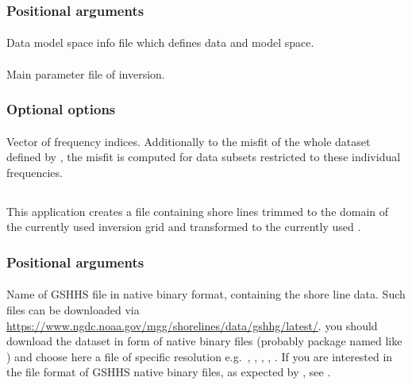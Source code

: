\subsubsection{Positional arguments}
\paragraph{}
Data model space info file which defines data and model space.
\paragraph{}
Main parameter file of inversion.
\subsubsection{Optional options}
\paragraph{}
Vector of  frequency indices. Additionally to the misfit of the whole dataset defined by 
, the misfit is computed for data subsets restricted to these individual frequencies.
%
%
\subsection{} \label{programs_scripts,sec:bin_prog,sec:shore_lines}
This application creates a  file containing shore lines trimmed to the domain of the
currently used inversion grid and transformed to the currently used .


\subsubsection{Positional arguments}
\paragraph{}
Name of GSHHS file in native binary format, containing the shore line data. Such files can be downloaded
via \url{https://www.ngdc.noaa.gov/mgg/shorelines/data/gshhg/latest/}. you should download the 
dataset in form of native binary files (probably package named like ) and choose here
a file of specific resolution e.g.\ , 
, , , .
If you are interested in the file format of GSHHS native binary files, as expected by \ASKI{}, see
.
